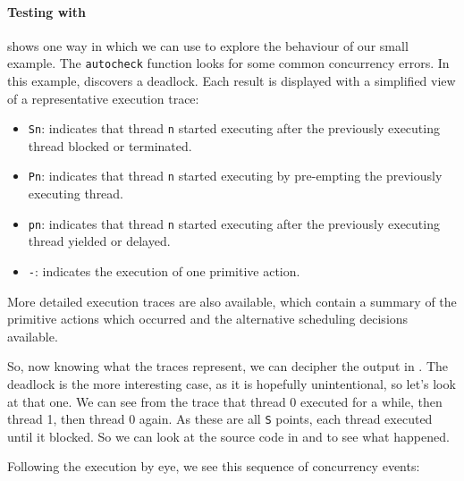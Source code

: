 \paragraph{Testing with \dejafu{}}
 shows one way in which we can use
\dejafu{} to explore the behaviour of our small example.  The
\verb|autocheck| function looks for some common concurrency errors.
In this example, \dejafu{} discovers a deadlock.  Each result is
displayed with a simplified view of a representative execution trace:

\begin{itemize}
\item \verb|Sn|: indicates that thread \verb|n| started executing
  after the previously executing thread blocked or terminated.
\item \verb|Pn|: indicates that thread \verb|n| started executing by
  pre-empting the previously executing thread.
\item \verb|pn|: indicates that thread \verb|n| started executing
  after the previously executing thread yielded or delayed.
\item \verb|-|: indicates the execution of one primitive action.
\end{itemize}

More detailed execution traces are also available, which contain a
summary of the primitive actions which occurred and the alternative
scheduling decisions available.

So, now knowing what the traces represent, we can decipher the output
in .  The deadlock is the more
interesting case, as it is hopefully unintentional, so let's look at
that one.  We can see from the trace that thread 0 executed for a
while, then thread 1, then thread 0 again.  As these are all \verb|S|
points, each thread executed until it blocked.  So we can look at the
source code in  and
 to see what happened.

Following the execution by eye, we see this sequence of concurrency
events:

